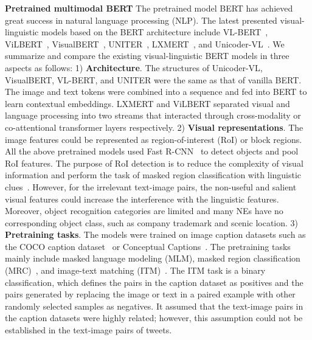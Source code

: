 \documentclass[letterpaper]{article} \usepackage{aaai21}  \usepackage{times}  \usepackage{helvet} \usepackage{courier}  \usepackage[hyphens]{url}  \usepackage{graphicx} \urlstyle{rm} \def\UrlFont{\rm}  \usepackage{natbib}  \usepackage{caption} \frenchspacing  \setlength{\pdfpagewidth}{8.5in}  \setlength{\pdfpageheight}{11in}
\begin{document}
\smallskip
\noindent
\textbf{Pretrained multimodal BERT} 
The pretrained model BERT has achieved great success in natural language processing (NLP). 
The latest presented visual-linguistic models based on the BERT architecture include VL-BERT~\cite{su2019vl}, ViLBERT~\cite{lu2019vilbert}, VisualBERT~\cite{li2019visualbert}, UNITER~\cite{chen2020uniter}, LXMERT~\cite{tan2019lxmert},  and Unicoder-VL~\cite{li2020unicoder}.
We summarize and compare the existing visual-linguistic BERT models in three aspects as follows: 
1) \textbf{Architecture}. The structures of Unicoder-VL, VisualBERT, VL-BERT, and UNITER were the same as that of vanilla BERT. The image and text tokens  were combined into a sequence and fed into BERT to learn contextual embeddings.
LXMERT and ViLBERT separated visual and language processing into two streams that interacted through cross-modality or co-attentional transformer layers respectively.
2) \textbf{Visual representations}. The image features could be represented as region-of-interest (RoI) or block regions.
All the above pretrained models used Fast R-CNN~\cite{girshick2015fast} to detect objects and pool RoI features.
The purpose of RoI detection is to reduce the complexity of visual information and perform the task of masked region classification with  linguistic clues~\cite{su2019vl,li2020unicoder}.
However, for the irrelevant text-image pairs, the non-useful and salient visual features could increase the interference with the linguistic features.
Moreover, object recognition categories are limited and many NEs have no corresponding object class, such as company trademark and scenic location.
3) \textbf{Pretraining tasks}. The models were trained on image caption datasets such as the COCO caption dataset~\cite{chen2015microsoft} or Conceptual Captions~\cite{sharma-etal-2018-conceptual}.
The pretraining tasks mainly include  masked language modeling (MLM), masked region classification (MRC)~\cite{chen2020uniter,tan2019lxmert,li2020unicoder,su2019vl}, and image-text matching (ITM)~\cite{chen2020uniter,li2020unicoder,lu2019vilbert}.
The ITM task is a binary classification, which defines the pairs in the caption dataset as positives and the pairs generated by replacing the image or text in a paired example with other randomly selected samples as negatives.
It assumed that the text-image pairs in the caption datasets were highly related; however, this assumption could not be established in the text-image pairs of tweets.
\end{document}
